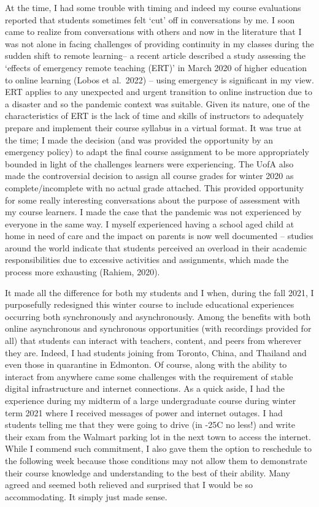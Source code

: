 \documentclass[
]{book}
\begin{document}
At the time, I had some trouble with timing and indeed my course evaluations reported that students sometimes felt `cut' off in conversations by me. I soon came to realize from conversations with others and now in the literature that I was not alone in facing challenges of providing continuity in my classes during the sudden shift to remote learning-- a recent article described a study assessing the `effects of emergency remote teaching (ERT)' in March 2020 of higher education to online learning (Lobos et al.~2022) -- using emergency is significant in my view. ERT applies to any unexpected and urgent transition to online instruction due to a disaster and so the pandemic context was suitable. Given its nature, one of the characteristics of ERT is the lack of time and skills of instructors to adequately prepare and implement their course syllabus in a virtual format. It was true at the time; I made the decision (and was provided the opportunity by an emergency policy) to adapt the final course assignment to be more appropriately bounded in light of the challenges learners were experiencing. The UofA also made the controversial decision to assign all course grades for winter 2020 as complete/incomplete with no actual grade attached. This provided opportunity for some really interesting conversations about the purpose of assessment with my course learners. I made the case that the pandemic was not experienced by everyone in the same way. I myself experienced having a school aged child at home in need of care and the impact on parents is now well documented -- studies around the world indicate that students perceived an overload in their academic responsibilities due to excessive activities and assignments, which made the process more exhausting (Rahiem, 2020).

It made all the difference for both my students and I when, during the fall 2021, I purposefully redesigned this winter course to include educational experiences occurring both synchronously and asynchronously. Among the benefits with both online asynchronous and synchronous opportunities (with recordings provided for all) that students can interact with teachers, content, and peers from wherever they are. Indeed, I had students joining from Toronto, China, and Thailand and even those in quarantine in Edmonton. Of course, along with the ability to interact from anywhere came some challenges with the requirement of stable digital infrastructure and internet connections. As a quick aside, I had the experience during my midterm of a large undergraduate course during winter term 2021 where I received messages of power and internet outages. I had students telling me that they were going to drive (in -25C no less!) and write their exam from the Walmart parking lot in the next town to access the internet. While I commend such commitment, I also gave them the option to reschedule to the following week because those conditions may not allow them to demonstrate their course knowledge and understanding to the best of their ability. Many agreed and seemed both relieved and surprised that I would be so accommodating. It simply just made sense.
\end{document}
